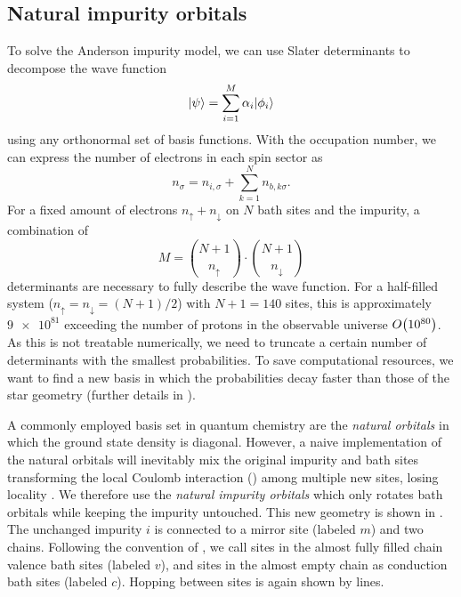 \subsection{Natural impurity orbitals}
\label{sec:natural-impurity-orbitals}

To solve the Anderson impurity model,
we can use Slater determinants to decompose the wave function
\begin{equation}
    \lvert\psi\rangle = \sum_{i=1}^M \alpha_i \lvert\phi_i\rangle
\end{equation}
using any orthonormal set of basis functions.
With the occupation number,
we can express the number of electrons in each spin sector as
\begin{equation}
    n_\sigma = n_{i,\sigma} + \sum_{k=1}^N n_{b,k\sigma}.
\end{equation}
For a fixed amount of electrons $n_\uparrow + n_\downarrow$ on $N$ bath sites and the impurity,
a combination of
\begin{equation}
    M = \binom{N+1}{n_\uparrow} \cdot \binom{N+1}{n_\downarrow}
\end{equation}
determinants are necessary to fully describe the wave function.
For a half-filled system ($n_\uparrow = n_\downarrow = (N+1)/2$)
with $N+1=140$ sites, this is approximately $\num{9e81}$
exceeding the number of protons in the observable universe $O\!\left(\num{e80}\right)$. %
As this is not treatable numerically,
we need to truncate a certain number of determinants with the smallest probabilities.
To save computational resources,
we want to find a new basis in which the probabilities decay faster than those of the star geometry
(further details in \cite{Bi2019}).

A commonly employed basis set in quantum chemistry are the \emph{natural orbitals}
in which the ground state density is diagonal.
However,
a naive implementation of the natural orbitals will inevitably mix the original impurity
and bath sites transforming the local Coulomb interaction ()
among multiple new sites,
losing locality \cite{Lu2014,Lu2019}.
We therefore use the \emph{natural impurity orbitals}
which only rotates bath orbitals while keeping the impurity untouched.
This new geometry is shown in .
The unchanged impurity $i$ is connected to a mirror site (labeled $m$) and two chains.
Following the convention of \cite{Lu2014,Lu2019},
we call sites in the almost fully filled chain valence bath sites (labeled $v$),
and sites in the almost empty chain as conduction bath sites (labeled $c$).
Hopping between sites is again shown by lines.

